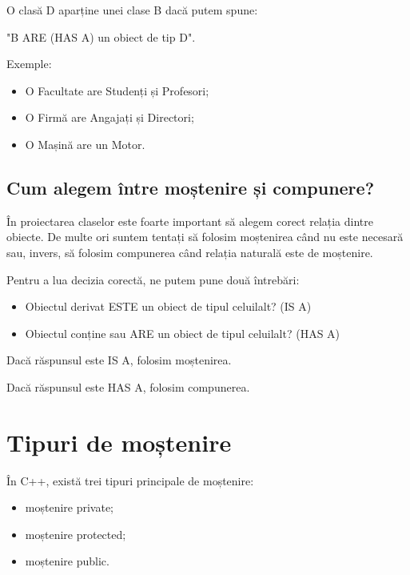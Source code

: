 \documentclass[12pt,a4paper]{article}
\begin{document}
O clasă D aparține unei clase B dacă putem spune:

"B ARE (HAS A) un obiect de tip D".

Exemple:

\begin{itemize}
\item O Facultate are Studenți și Profesori;
\item O Firmă are Angajați și Directori;
\item O Mașină are un Motor.
\end{itemize}

\subsection{Cum alegem între moștenire și compunere?}

În proiectarea claselor este foarte important să alegem corect relația dintre obiecte. De multe ori suntem tentați să folosim moștenirea când nu este necesară sau, invers, să folosim compunerea când relația naturală este de moștenire.

Pentru a lua decizia corectă, ne putem pune două întrebări:

\begin{itemize}
\item Obiectul derivat ESTE un obiect de tipul celuilalt? (IS A)
\item Obiectul conține sau ARE un obiect de tipul celuilalt? (HAS A)
\end{itemize}

Dacă răspunsul este IS A, folosim moștenirea.

Dacă răspunsul este HAS A, folosim compunerea.
























\section{Tipuri de moștenire}

În C++, există trei tipuri principale de moștenire:

\begin{itemize}
\item moștenire private;
\item moștenire protected;
\item moștenire public.
\end{itemize}
\end{document}
